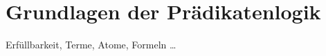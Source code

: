 \chapter{Grundlagen der Prädikatenlogik}
\label{chapter:fol}
Erfüllbarkeit, Terme, Atome, Formeln \ldots \cite{kastens}
